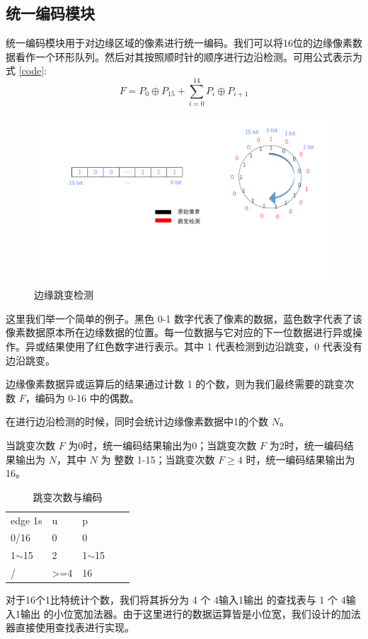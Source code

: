 \documentclass[12pt, a4paper, oneside]{ctexbook}
\begin{document}
	\subsection{统一编码模块}
	统一编码模块用于对边缘区域的像素进行统一编码。我们可以将16位的边缘像素数据看作一个环形队列。然后对其按照顺时针的顺序进行边沿检测。可用公式表示为式 \ref{code}:
	\begin{equation}
	F=P_{0}\oplus P_{15} + \sum_{i=0}^{14}P_i \oplus P_{i+1}
	\label{code}
	\end{equation}
	\par
		\begin{figure}[h]	
		\centering
		\includegraphics[scale=0.5]{pic/uniform.pdf}
		\caption{边缘跳变检测}
		\end{figure}
	这里我们举一个简单的例子。黑色 0-1 数字代表了像素的数据，蓝色数字代表了该像素数据原本所在边缘数据的位置。每一位数据与它对应的下一位数据进行异或操作。异或结果使用了红色数字进行表示。其中 1 代表检测到边沿跳变，0 代表没有边沿跳变。\par 	边缘像素数据异或运算后的结果通过计数 1 的个数，则为我们最终需要的跳变次数 $F$，编码为 0-16 中的偶数。\par 在进行边沿检测的时候，同时会统计边缘像素数据中1的个数 $N$。\par 当跳变次数 $F$ 为0时，统一编码结果输出为0；当跳变次数 $F$ 为2时，统一编码结果输出为 $N$，其中 $N$ 为 整数 1-15；当跳变次数 $F \geq 4$ 时，统一编码结果输出为16。
		\begin{table}[h]
		\centering
		\begin{tabular}{|l|l|l|ll}
			\cline{1-3}
			edge 1s   & u                & p           \\ \cline{1-3}
			0/16      & 0                & 0           \\ \cline{1-3}
			1$\sim$15 & 2                & 1$\sim$15   \\ \cline{1-3}
			/         & \textgreater{}=4 & 16          \\ \cline{1-3}
		\end{tabular}
		\caption{跳变次数与编码}
		\end{table}
	\par 对于16个1比特统计个数，我们将其拆分为 4 个 4输入1输出 的查找表与 1 个 4输入1输出 的小位宽加法器。由于这里进行的数据运算皆是小位宽，我们设计的加法器直接使用查找表进行实现。
\end{document}
